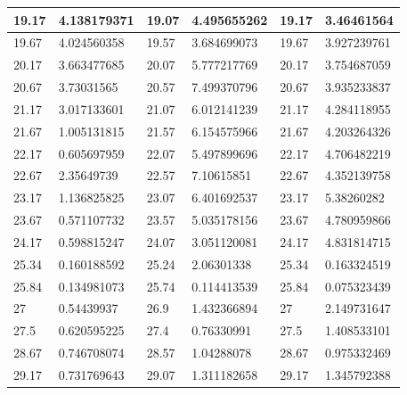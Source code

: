 \documentclass[11pt, letterpaper]{article}
\begin{document}
\begin{appendices}
\begin{table}[!ht]
\begin{tabular}{|l|l|l|l|l|l|}
        19.17 & 4.138179371 & 19.07 & 4.495655262 & 19.17 & 3.46461564 \\ \hline
        19.67 & 4.024560358 & 19.57 & 3.684699073 & 19.67 & 3.927239761 \\ \hline
        20.17 & 3.663477685 & 20.07 & 5.777217769 & 20.17 & 3.754687059 \\ \hline
        20.67 & 3.73031565 & 20.57 & 7.499370796 & 20.67 & 3.935233837 \\ \hline
        21.17 & 3.017133601 & 21.07 & 6.012141239 & 21.17 & 4.284118955 \\ \hline
        21.67 & 1.005131815 & 21.57 & 6.154575966 & 21.67 & 4.203264326 \\ \hline
        22.17 & 0.605697959 & 22.07 & 5.497899696 & 22.17 & 4.706482219 \\ \hline
        22.67 & 2.35649739 & 22.57 & 7.10615851 & 22.67 & 4.352139758 \\ \hline
        23.17 & 1.136825825 & 23.07 & 6.401692537 & 23.17 & 5.38260282 \\ \hline
        23.67 & 0.571107732 & 23.57 & 5.035178156 & 23.67 & 4.780959866 \\ \hline
        24.17 & 0.598815247 & 24.07 & 3.051120081 & 24.17 & 4.831814715 \\ \hline
        25.34 & 0.160188592 & 25.24 & 2.06301338 & 25.34 & 0.163324519 \\ \hline
        25.84 & 0.134981073 & 25.74 & 0.114413539 & 25.84 & 0.075323439 \\ \hline
        27 & 0.54439937 & 26.9 & 1.432366894 & 27 & 2.149731647 \\ \hline
        27.5 & 0.620595225 & 27.4 & 0.76330991 & 27.5 & 1.408533101 \\ \hline
        28.67 & 0.746708074 & 28.57 & 1.04288078 & 28.67 & 0.975332469 \\ \hline
        29.17 & 0.731769643 & 29.07 & 1.311182658 & 29.17 & 1.345792388 \\ \hline
    \end{tabular}
\end{table}



\end{appendices}
\end{document}
